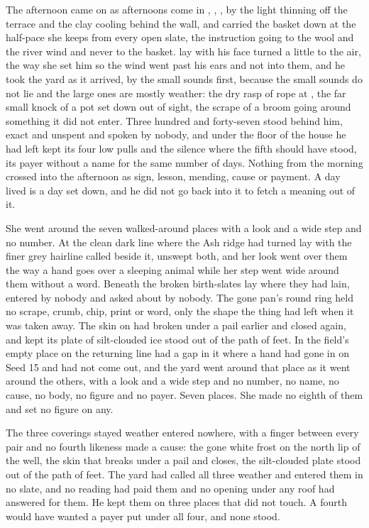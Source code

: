 The afternoon came on as afternoons come in , , , by the light thinning off the terrace and the clay cooling behind the wall, and  carried the basket down at the half-pace she keeps from every open slate, the instruction going to the wool and the river wind and never to the basket.  lay with his face turned a little to the air, the way she set him so the wind went past his ears and not into them, and he took the yard as it arrived, by the small sounds first, because the small sounds do not lie and the large ones are mostly weather: the dry rasp of rope at , the far small knock of a pot set down out of sight, the scrape of a broom going around something it did not enter. Three hundred and forty-seven stood behind him, exact and unspent and spoken by nobody, and under the floor of the house he had left  kept its four low pulls and the silence where the fifth should have stood, its payer without a name for the same number of days. Nothing from the morning crossed into the afternoon as sign, lesson, mending, cause or payment. A day lived is a day set down, and he did not go back into it to fetch a meaning out of it.

She went around the seven walked-around places with a look and a wide step and no number. At  the clean dark line where the Ash ridge had turned lay with the finer grey hairline called  beside it, unswept both, and her look went over them the way a hand goes over a sleeping animal while her step went wide around them without a word. Beneath  the broken birth-slates lay where they had lain, entered by nobody and asked about by nobody. The gone pan's round ring held no scrape, crumb, chip, print or word, only the shape the thing had left when it was taken away. The skin on  had broken under a pail earlier and closed again, and  kept its plate of silt-clouded ice stood out of the path of feet. In the field's empty place on  the returning line had a gap in it where a hand had gone in on Seed 15 and had not come out, and the yard went around that place as it went around the others, with a look and a wide step and no number, no name, no cause, no body, no figure and no payer. Seven places. She made no eighth of them and set no figure on any.

The three coverings stayed weather entered nowhere, with a finger between every pair and no fourth likeness made a cause: the gone white frost on the north lip of the well, the skin that breaks under a pail and closes, the silt-clouded plate stood out of the path of feet. The yard had called all three weather and entered them in no slate, and no reading had paid them and no opening under any roof had answered for them. He kept them on three places that did not touch. A fourth would have wanted a payer put under all four, and none stood.

